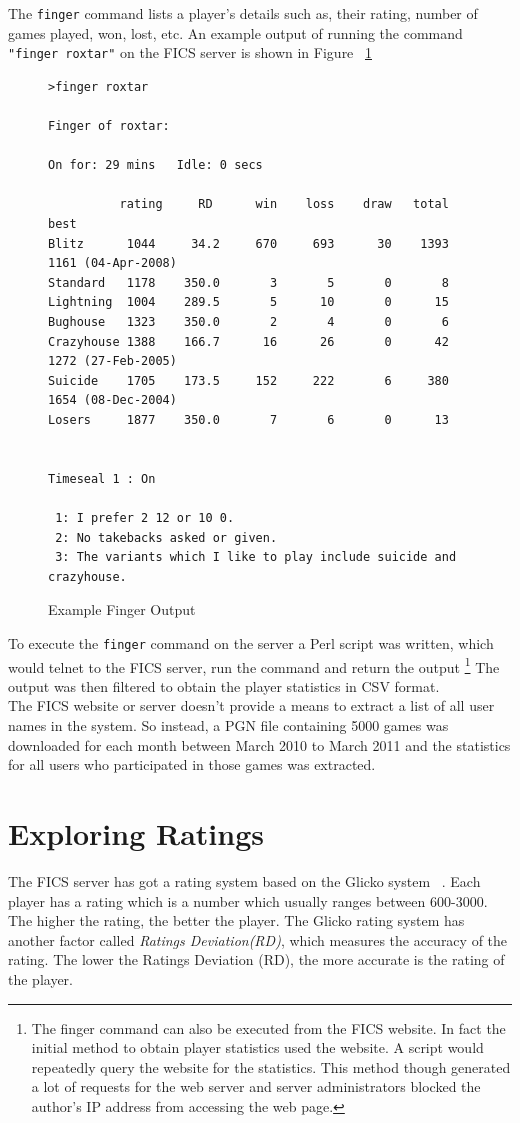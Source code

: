\documentclass{article}
\begin{document}
The \verb=finger= command lists a player's details such as, their rating, number of games played, won, lost, etc. An example output of running the command \verb="finger roxtar"= on the FICS server is shown in Figure ~\ref{fig:finger}

\begin{figure}[tph]
\begin{verbatim}
>finger roxtar

Finger of roxtar:

On for: 29 mins   Idle: 0 secs

          rating     RD      win    loss    draw   total   best
Blitz      1044     34.2     670     693      30    1393   1161 (04-Apr-2008)
Standard   1178    350.0       3       5       0       8
Lightning  1004    289.5       5      10       0      15
Bughouse   1323    350.0       2       4       0       6
Crazyhouse 1388    166.7      16      26       0      42   1272 (27-Feb-2005)
Suicide    1705    173.5     152     222       6     380   1654 (08-Dec-2004)
Losers     1877    350.0       7       6       0      13


Timeseal 1 : On

 1: I prefer 2 12 or 10 0.
 2: No takebacks asked or given.
 3: The variants which I like to play include suicide and crazyhouse.
\end{verbatim}
\caption{Example Finger Output}
\label{fig:finger}
\end{figure}

To execute the \verb=finger= command on the server a Perl script was written, which would telnet to the FICS server, run the command and return the output \footnote{The finger command can also be executed from the FICS website. In fact the initial method to obtain player statistics used the website. A script would repeatedly query the website for the statistics. This method though generated a lot of requests for the web server and server administrators blocked the author's IP address from accessing the web page.}  The output was then filtered to obtain the player statistics in CSV format. \\

The FICS website or server doesn't provide a means to extract a list of all user names in the system. So instead, a PGN file containing 5000 games was downloaded for each month between March 2010 to March 2011 and the statistics for all users who participated in those games was extracted. 

\section{Exploring Ratings}
The FICS server has got a rating system based on the Glicko system ~\cite{spec:glicko}. Each player has a rating which is a number which usually ranges between 600-3000. The higher the rating, the better the player. The Glicko rating system has another factor called \textsl{Ratings Deviation(RD)}, which measures the accuracy of the rating. The lower the Ratings Deviation (RD), the more accurate is the rating of the player.\\
\end{document}
